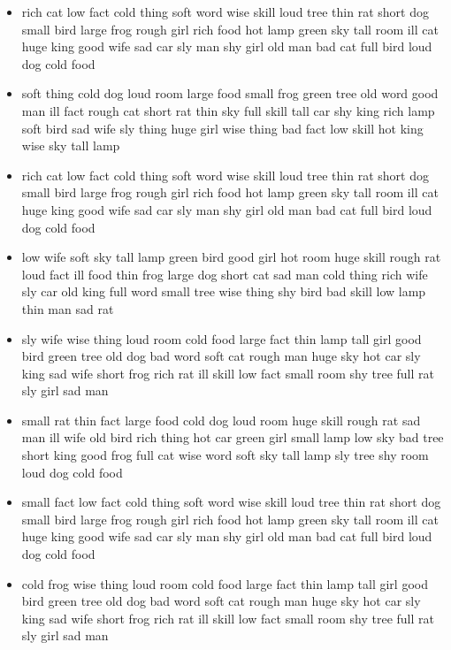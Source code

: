 \documentclass[10pt,letterpaper]{article}
\begin{document}
\begin{flushleft}
\begin{itemize}
  \item rich
cat
low
fact
cold
thing
soft
word
wise
skill
loud
tree
thin
rat
short
dog
small
bird
large
frog
rough
girl
rich
food
hot
lamp
green
sky
tall
room
ill
cat
huge
king
good
wife
sad
car
sly
man
shy
girl
old
man
bad
cat
full
bird
loud
dog
cold
food

  \item soft
thing
cold
dog
loud
room
large
food
small
frog
green
tree
old
word
good
man
ill
fact
rough
cat
short
rat
thin
sky
full
skill
tall
car
shy
king
rich
lamp
soft
bird
sad
wife
sly
thing
huge
girl
wise
thing
bad
fact
low
skill
hot
king
wise
sky
tall
lamp

  \item rich
cat
low
fact
cold
thing
soft
word
wise
skill
loud
tree
thin
rat
short
dog
small
bird
large
frog
rough
girl
rich
food
hot
lamp
green
sky
tall
room
ill
cat
huge
king
good
wife
sad
car
sly
man
shy
girl
old
man
bad
cat
full
bird
loud
dog
cold
food
  \item low
wife
soft
sky
tall
lamp
green
bird
good
girl
hot
room
huge
skill
rough
rat
loud
fact
ill
food
thin
frog
large
dog
short
cat
sad
man
cold
thing
rich
wife
sly
car
old
king
full
word
small
tree
wise
thing
shy
bird
bad
skill
low
lamp
thin
man
sad
rat

  \item sly
wife
wise
thing
loud
room
cold
food
large
fact
thin
lamp
tall
girl
good
bird
green
tree
old
dog
bad
word
soft
cat
rough
man
huge
sky
hot
car
sly
king
sad
wife
short
frog
rich
rat
ill
skill
low
fact
small
room
shy
tree
full
rat
sly
girl
sad
man
  \item small
rat
thin
fact
large
food
cold
dog
loud
room
huge
skill
rough
rat
sad
man
ill
wife
old
bird
rich
thing
hot
car
green
girl
small
lamp
low
sky
bad
tree
short
king
good
frog
full
cat
wise
word
soft
sky
tall
lamp
sly
tree
shy
room
loud
dog
cold
food

  \item small
fact
low
fact
cold
thing
soft
word
wise
skill
loud
tree
thin
rat
short
dog
small
bird
large
frog
rough
girl
rich
food
hot
lamp
green
sky
tall
room
ill
cat
huge
king
good
wife
sad
car
sly
man
shy
girl
old
man
bad
cat
full
bird
loud
dog
cold
food

  \item cold
frog
wise
thing
loud
room
cold
food
large
fact
thin
lamp
tall
girl
good
bird
green
tree
old
dog
bad
word
soft
cat
rough
man
huge
sky
hot
car
sly
king
sad
wife
short
frog
rich
rat
ill
skill
low
fact
small
room
shy
tree
full
rat
sly
girl
sad
man


\end{itemize}
\end{flushleft}
\end{document}
